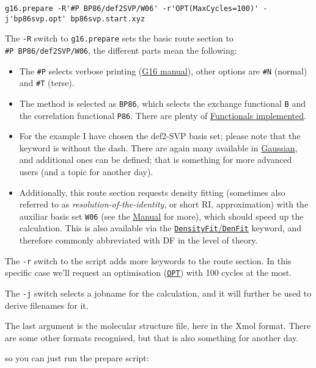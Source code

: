 \documentclass[   %
  final,          %
  a4paper         %
]{article}
\begin{document}
\begin{enumerate}
{  \lstinline`g16.prepare -R'#P BP86/def2SVP/W06' -r'OPT(MaxCycles=100)' -j'bp86svp.opt' bp86svp.start.xyz`

  The \lstinline`-R` switch to \lstinline`g16.prepare` sets the basic route section to
  \texttt{\#P\ BP86/def2SVP/W06}, the different parts mean the following:

  \begin{itemize}
  \item
    The \texttt{\#P} selects verbose printing
    (\href{http://gaussian.com/route/?tabid=1}{G16 manual}), other
    options are \texttt{\#N} (normal) and \texttt{\#T} (terse).
  \item
    The method is selected as \texttt{BP86}, which selects the exchange
    functional \texttt{B} and the correlation functional \texttt{P86}.
    There are plenty of \href{http://gaussian.com/dft/}{Functionals
    implemented}.
  \item
    For the example I have chosen the def2-SVP basis set; please note
    that the keyword is without the dash. There are again many available
    in \href{http://gaussian.com/basissets/}{Gaussian}, and additional
    ones can be defined; that is something for more advanced users (and
    a topic for another day).
  \item
    Additionally, this route section requests density fitting (sometimes
    also referred to as \emph{resolution-of-the-identity}, or short RI,
    approximation) with the auxiliar basis set \texttt{W06} (see the
    \href{http://gaussian.com/basissets/?tabid=2}{Manual} for more),
    which should speed up the calculation. This is also available via
    the \href{http://gaussian.com/densityfit/}{\texttt{DensityFit}/\texttt{DenFit}}
    keyword, and therefore commonly abbreviated with DF in the level of
    theory.
  \end{itemize}

  The \lstinline`-r` switch to the script adds more keywords to the route
  section. In this specific case we'll request an optimisation
  (\href{http://gaussian.com/opt/}{\texttt{OPT}}) with 100 cycles at the
  most.

  The \lstinline`-j` switch selects a jobname for the calculation, and it
  will further be used to derive filenames for it.

  The last argument is the molecular structure file, here in the Xmol
  format. There are some other formats recognised, but that is also
  something for another day.}
  so you can just run the prepare script:


\end{enumerate}
\end{document}
